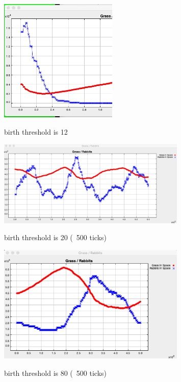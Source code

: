 \documentclass[11pt]{article}
\begin{document}
\begin{figure}[H]
\includegraphics[width=0.5\textwidth]{ex3-chart-12}
\centering
\label{fig:ex3-12}
\caption{ birth threshold is 12 }
\end{figure}

\begin{figure}[H]
\includegraphics[width=0.8\textwidth]{ex3-chart-20}
\centering
\label{fig:ex3-20}
\caption{ birth threshold is 20 (~500 ticks) }
\end{figure}

\begin{figure}[H]
\includegraphics[width=0.8\textwidth]{ex3-chart-80}
\centering
\label{fig:ex3-80}
\caption{ birth threshold is 80 (~500 ticks) }
\end{figure}
\end{document}
